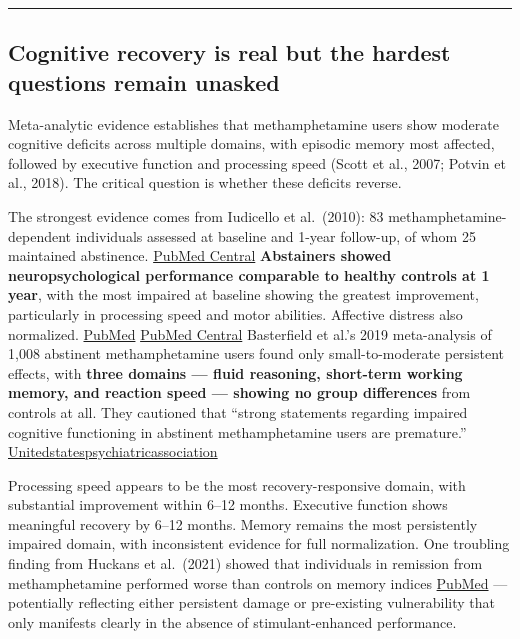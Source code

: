\begin{center}\rule{0.5\linewidth}{0.5pt}\end{center}

\subsection{Cognitive recovery is real but the hardest questions remain unasked}\label{14_what_we_dont_know-cognitive-recovery-is-real-but-the-hardest-questions-remain-unasked}

Meta-analytic evidence establishes that methamphetamine users show moderate cognitive deficits across multiple domains, with episodic memory most affected, followed by executive function and processing speed (Scott et al., 2007; Potvin et al., 2018). The critical question is whether these deficits reverse.

The strongest evidence comes from Iudicello et al.~(2010): 83 methamphetamine-dependent individuals assessed at baseline and 1-year follow-up, of whom 25 maintained abstinence. \href{https://pmc.ncbi.nlm.nih.gov/articles/PMC2911490/}{PubMed Central} \textbf{Abstainers showed neuropsychological performance comparable to healthy controls at 1 year}, with the most impaired at baseline showing the greatest improvement, particularly in processing speed and motor abilities. Affective distress also normalized. \href{https://pubmed.ncbi.nlm.nih.gov/20198527/}{PubMed} \href{https://pmc.ncbi.nlm.nih.gov/articles/PMC2911490/}{PubMed Central} Basterfield et al.'s 2019 meta-analysis of 1,008 abstinent methamphetamine users found only small-to-moderate persistent effects, with \textbf{three domains --- fluid reasoning, short-term working memory, and reaction speed --- showing no group differences} from controls at all. They cautioned that ``strong statements regarding impaired cognitive functioning in abstinent methamphetamine users are premature.'' \href{https://unitedstatespsychiatricassociation.com/general/a-meta-analysis-of-the-relationship-between-abstinence-and-neuropsychological-functioning-in-methamphetamine-use-disorder/}{Unitedstatespsychiatricassociation}

Processing speed appears to be the most recovery-responsive domain, with substantial improvement within 6--12 months. Executive function shows meaningful recovery by 6--12 months. Memory remains the most persistently impaired domain, with inconsistent evidence for full normalization. One troubling finding from Huckans et al.~(2021) showed that individuals in remission from methamphetamine performed worse than controls on memory indices \href{https://pubmed.ncbi.nlm.nih.gov/34612792/}{PubMed} --- potentially reflecting either persistent damage or pre-existing vulnerability that only manifests clearly in the absence of stimulant-enhanced performance.

